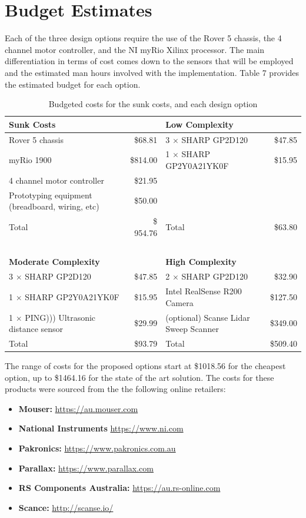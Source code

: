 \documentclass[a4paper]{article}
\begin{document}
\section{Budget Estimates}
Each of the three design options require the use of the Rover 5 chassis, the 4 channel motor controller, and the NI myRio Xilinx processor. The main differentiation in terms of cost comes down to the sensors that will be employed and the estimated man hours involved with the implementation. Table 7 provides the estimated budget for each option.
\begin{table}[h]
\centering
\caption{Budgeted costs for the sunk costs, and each design option}
\begin{tabular}{p{6cm}rp{6cm}r}
\toprule
\textbf{Sunk Costs} & & \textbf{Low Complexity} & \\
\midrule
Rover 5 chassis & \$68.81 & 3 $\times$ SHARP GP2D120 & \$47.85 \\
myRio 1900 & \$814.00 & 1 $\times$ SHARP GP2Y0A21YK0F & \$15.95 \\
4 channel motor controller & \$21.95 &  & \\
Prototyping equipment (breadboard, wiring, etc) & \$50.00 & & \\
\midrule
Total & \$ 954.76 & Total & \$63.80 \\
\midrule
\ & & & \\
\midrule
\textbf{Moderate Complexity} & & \textbf{High Complexity} & \\
\midrule
3 $\times$ SHARP GP2D120 & \$47.85 & 2 $\times$ SHARP GP2D120 & \$32.90 \\
1 $\times$ SHARP GP2Y0A21YK0F & \$15.95 & Intel RealSense R200 Camera & \$127.50 \\
1 $\times$ PING))) Ultrasonic distance sensor & \$29.99 & (optional) Scanse Lidar Sweep Scanner & \$349.00 \\
\midrule
Total & \$93.79 & Total & \$509.40 \\
\bottomrule
\end{tabular}
\end{table}

The range of costs for the proposed options start at \$1018.56 for the cheapest option, up to \$1464.16 for the state of the art solution. The costs for these products were sourced from the the following online retailers:
\begin{itemize}
\item \textbf{Mouser:} \url{https://au.mouser.com}
\item \textbf{National Instruments} \url{https://www.ni.com}
\item {\textbf{Pakronics:}} \url{https://www.pakronics.com.au}
\item \textbf{Parallax:} \url{https://www.parallax.com}
\item \textbf{RS Components Australia:} \url{https://au.rs-online.com}
\item \textbf{Scance:} \url{http://scanse.io/}
\end{itemize}
\end{document}
